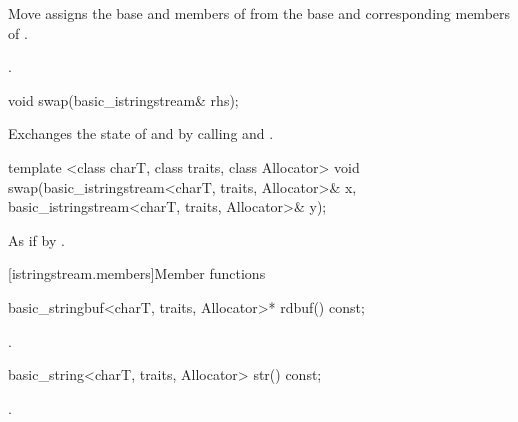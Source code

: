 \begin{itemdescr}
\pnum
\effects Move assigns the base and members of  from the base and corresponding
members of .

\pnum
\returns {}.
\end{itemdescr}

%
%
\begin{itemdecl}
void swap(basic_istringstream& rhs);
\end{itemdecl}

\begin{itemdescr}
\pnum
\effects Exchanges the state of  and
 by calling
 and
.
\end{itemdescr}


%
%
\begin{itemdecl}
template <class charT, class traits, class Allocator>
  void swap(basic_istringstream<charT, traits, Allocator>& x,
            basic_istringstream<charT, traits, Allocator>& y);
\end{itemdecl}

\begin{itemdescr}
\pnum
\effects As if by .
\end{itemdescr}

[istringstream.members]{Member functions}

%
\begin{itemdecl}
basic_stringbuf<charT, traits, Allocator>* rdbuf() const;
\end{itemdecl}

\begin{itemdescr}
\pnum
\returns
{}.
\end{itemdescr}

%
\begin{itemdecl}
basic_string<charT, traits, Allocator> str() const;
\end{itemdecl}

\begin{itemdescr}
\pnum
\returns
{}.
\end{itemdescr}


